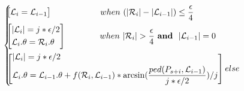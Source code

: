 \begin{small}
	\vspace{-2ex}
	\begin{equation*}
	\label{equ-function}
	\hspace{-1.5ex}\left\{
	\begin{aligned}
	&\hspace{-1.5ex}\left[
	\begin{aligned}
	& \mathcal{L}_{i} = \mathcal{L}_{i-1}\\
	\end{aligned}
	\right]\hspace{12.5ex}~when~(|\mathcal{R}_{i}| - |\mathcal{L}_{i-1}|) \le \frac{\epsilon}{4}   \\
	&\hspace{-1.5ex}\left[
	\begin{aligned}
	& |\mathcal{L}_{i}|  = j*{\epsilon}/{2} \\
	& \mathcal{L}_{i}.\theta = \mathcal{R}_{i}.\theta    \\
	\end{aligned}
	\right]\hspace{8.5ex}~when~|\mathcal{R}_{i}| >  \frac{\epsilon}{4}~\And~|\mathcal{L}_{i-1}|=0    \\
	&\hspace{-1.5ex}\left[
	\begin{aligned}
	& |\mathcal{L}_{i}|  = j*{\epsilon}/{2}\\
	& \mathcal{L}_{i}.\theta = \mathcal{L}_{i-1}.\theta + f(\mathcal{R}_i,\mathcal{L}_{i-1})*\arcsin(\frac{ped(P_{s+i}, \mathcal{L}_{i-1})}{j*\epsilon/2})/j \\	
	\end{aligned}
	\right]\hspace{0ex}else\\
	\end{aligned}
	\right.
	\end{equation*}
	\vspace{-2ex}
\end{small}


